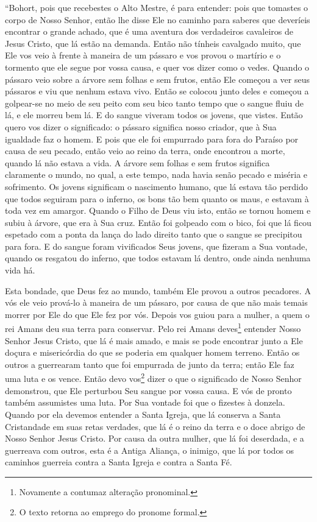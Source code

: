 “Bohort, pois que recebestes o Alto Mestre, é para entender: pois que tomastes o
corpo de Nosso Senhor, então lhe disse Ele no caminho para saberes que
deveríeis encontrar o grande achado, que é uma aventura dos verdadeiros
cavaleiros de Jesus Cristo, que lá estão na demanda. Então não tínheis
cavalgado muito, que Ele vos veio à frente à maneira de um pássaro e vos provou
o martírio e o tormento que ele segue por vossa causa, e quer vos dizer como o
vedes. Quando o pássaro veio sobre a árvore sem folhas e sem frutos, então Ele
começou a ver seus pássaros e viu que nenhum estava vivo. Então se colocou
junto deles e começou a golpear-se no meio de seu peito com seu bico tanto
tempo que o sangue fluiu de lá, e ele morreu bem lá. E do sangue viveram todos
os jovens, que vistes. Então quero vos dizer o significado: o pássaro significa
nosso criador, que à Sua igualdade faz o homem. E pois que ele foi empurrado
para fora do Paraíso por causa de seu pecado, então veio ao reino da terra,
onde encontrou a morte, quando lá não estava a vida. A árvore sem folhas e sem
frutos significa claramente o mundo, no qual, a este tempo, nada havia senão
pecado e miséria e sofrimento. Os jovens significam o nascimento humano, que lá
estava tão perdido que todos seguiram para o inferno, os bons tão bem quanto os
maus, e estavam à toda vez em amargor. Quando o Filho de Deus viu isto, então
se tornou homem e subiu à árvore, que era à Sua cruz. Então foi golpeado com o
bico, foi que lá ficou espetado com a ponta da lança do lado direito tanto que
o sangue se precipitou para fora. E do sangue foram vivificados Seus jovens,
que fizeram a Sua vontade, quando os resgatou do inferno, que todos estavam lá
dentro, onde ainda nenhuma vida há. 

Esta bondade, que Deus fez ao mundo, também Ele provou a outros pecadores. A vós
ele veio prová-lo à maneira de um pássaro, por causa de que não mais temais
morrer por Ele do que Ele fez por vós. Depois vos guiou para a mulher, a quem o
rei Amans deu sua terra para conservar. Pelo rei Amans deves\footnote{
Novamente a contumaz alteração pronominal. } entender Nosso Senhor
Jesus Cristo, que lá é mais amado, e mais se pode encontrar junto a Ele doçura
e misericórdia do que se poderia em qualquer homem terreno. Então os outros a
guerrearam tanto que foi empurrada de junto da terra; então Ele faz uma luta e
os vence. Então devo vos\footnote{ O texto retorna ao emprego
do pronome formal.}  dizer o que o significado de Nosso Senhor
demonstrou, que Ele perturbou Seu sangue por vossa causa. E vós de pronto
também assumistes uma luta. Por Sua vontade foi que o fizestes à donzela.
Quando por ela devemos entender a Santa Igreja, que lá conserva a Santa
Cristandade em suas retas verdades, que lá é o reino da terra e o doce abrigo
de Nosso Senhor Jesus Cristo. Por causa da outra mulher, que lá foi deserdada,
e a guerreava com outros, esta é a Antiga Aliança, o inimigo, que lá por todos
os caminhos guerreia contra a Santa Igreja e contra a Santa Fé.

